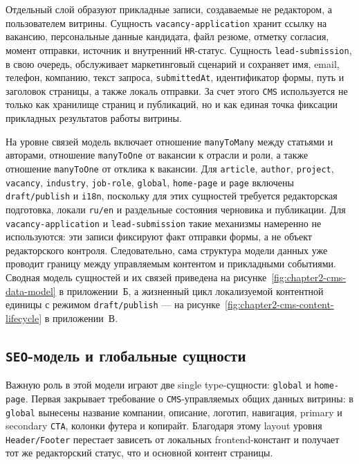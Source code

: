 Отдельный слой образуют прикладные записи, создаваемые не редактором, а пользователем
витрины. Сущность \texttt{vacancy-application} хранит ссылку на вакансию, персональные
данные кандидата, файл резюме, отметку согласия, момент отправки, источник и внутренний
\texttt{HR}-статус. Сущность \texttt{lead-submission}, в свою очередь, обслуживает
маркетинговый сценарий и сохраняет имя, email, телефон, компанию, текст запроса,
\texttt{submittedAt}, идентификатор формы, путь и заголовок страницы, а также локаль
отправки. За счет этого \texttt{CMS} используется не только как хранилище страниц и
публикаций, но и как единая точка фиксации прикладных результатов работы витрины.

На уровне связей модель включает отношение \texttt{manyToMany} между статьями и
авторами, отношение \texttt{manyToOne} от вакансии к отрасли и роли, а также отношение
\texttt{manyToOne} от отклика к вакансии. Для \texttt{article}, \texttt{author},
\texttt{project}, \texttt{vacancy}, \texttt{industry}, \texttt{job-role},
\texttt{global}, \texttt{home-page} и \texttt{page} включены \texttt{draft/publish} и
\texttt{i18n}, поскольку для этих сущностей требуется редакторская подготовка, локали
\texttt{ru/en} и раздельные состояния черновика и публикации. Для
\texttt{vacancy-application} и \texttt{lead-submission} такие механизмы намеренно не
используются: эти записи фиксируют факт отправки формы, а не объект редакторского
контроля. Следовательно, сама структура модели данных уже проводит границу между
управляемым контентом и прикладными событиями. Сводная модель сущностей и их связей
приведена на рисунке~\ref{fig:chapter2-cms-data-model} в приложении~Б, а жизненный цикл
локализуемой контентной единицы с режимом \texttt{draft/publish} --- на
рисунке~\ref{fig:chapter2-cms-content-lifecycle} в приложении~В.

\subsection{\texttt{SEO}-модель и глобальные сущности}

Важную роль в этой модели играют две single type-сущности: \texttt{global} и
\texttt{home-page}. Первая закрывает требование о \texttt{CMS}-управляемых общих данных
витрины: в \texttt{global} вынесены название компании, описание, логотип, навигация,
primary и secondary \texttt{CTA}, колонки футера и копирайт. Благодаря этому layout
уровня \texttt{Header/Footer} перестает зависеть от локальных frontend-констант и
получает тот же редакторский статус, что и основной контент страницы.

